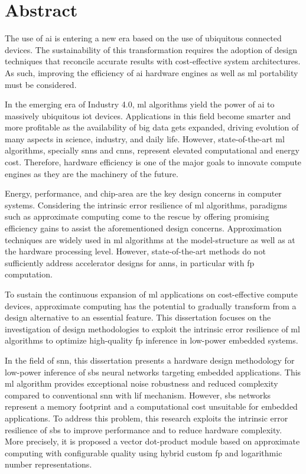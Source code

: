 \chapter*{Abstract}
\thispagestyle{empty}
The use of \gls{ai} is entering a new era based on the use of ubiquitous connected devices. The sustainability of this transformation requires the adoption of design techniques that reconcile accurate results with cost-effective system architectures. As such, improving the efficiency of \gls{ai} hardware engines as well as \gls{ml} portability must be considered.

In the emerging era of Industry 4.0, \gls{ml} algorithms yield the power of \gls{ai} to massively ubiquitous \gls{iot} devices. Applications in this field become smarter and more profitable as the availability of big data gets expanded, driving evolution of many aspects in science, industry, and daily life. However, state-of-the-art \gls{ml} algorithms, specially \glspl{snn} and \glspl{cnn}, represent elevated computational and energy cost. Therefore, hardware efficiency is one of the major goals to innovate compute engines as they are the machinery of the future.

Energy, performance, and chip-area are the key design concerns in computer systems. Considering the intrinsic error resilience of \gls{ml} algorithms, paradigms such as approximate computing come to the rescue by offering promising efficiency gains to assist the aforementioned design concerns. Approximation techniques are widely used in \gls{ml} algorithms at the model-structure as well as at the hardware processing level. However, state-of-the-art methods do not sufficiently address accelerator designs for \glspl{ann}, in particular with \gls{fp} computation.

To sustain the continuous expansion of \gls{ml} applications on cost-effective compute devices, approximate computing has the potential to gradually transform from a design alternative to an essential feature. This dissertation focuses on the investigation of design methodologies to exploit the intrinsic error resilience of \gls{ml} algorithms to optimize high-quality \gls{fp} inference in low-power embedded systems.

In the field of \gls{snn}, this dissertation presents a hardware design methodology for low-power inference of \gls{sbs} neural networks targeting embedded applications. This \gls{ml} algorithm provides exceptional noise robustness and reduced complexity compared to conventional \gls{snn} with \gls{lif} mechanism. However, \gls{sbs} networks represent a memory footprint and a computational cost unsuitable for embedded applications. To address this problem, this research exploits the intrinsic error resilience of \gls{sbs} to improve performance and to reduce hardware complexity. More precisely, it is proposed a vector dot-product module based on approximate computing with configurable quality using hybrid custom \gls{fp} and logarithmic number representations.


